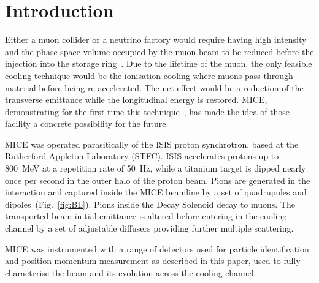 \section{Introduction}
\label{Sect:Intro}

Either a muon collider or a neutrino factory would require having high intensity and the phase-space volume occupied by the muon beam to be reduced before the injection into the storage ring~\cite{Geer:1998PhRvD..57.6989G}.
Due to the lifetime of the muon, the only feasible cooling technique would be the ionisation cooling \cite{Neuffer:1983jr} where muons pass through material before being re-accelerated. The net effect would be a reduction of the transverse emittance while the longitudinal energy is restored.
MICE, demonstrating for the first time this technique~\cite{Bogomilov:2019kfj}, has made the idea of those facility a concrete possibility for the future.
  
  
  
MICE was operated parasitically of the ISIS proton synchrotron, based at the Rutherford Appleton Laboratory (STFC).
ISIS accelerates protons up to 800~MeV at a repetition rate of 50~Hz, while a titanium target is dipped nearly once per second in the outer halo of the proton beam.
Pions are generated in the interaction and captured inside the MICE beamline by a set of quadrupoles and dipoles~(Fig.~\ref{fig:BL}). Pions inside the Decay Solenoid decay to muons.
The transported beam initial emittance is altered before entering in the cooling channel by a set of adjustable diffusers providing further multiple scattering.

MICE was instrumented with a range of detectors used for particle identification and position-momentum measurement as described in this paper, used to fully characterise the beam and its evolution across the cooling channel.
